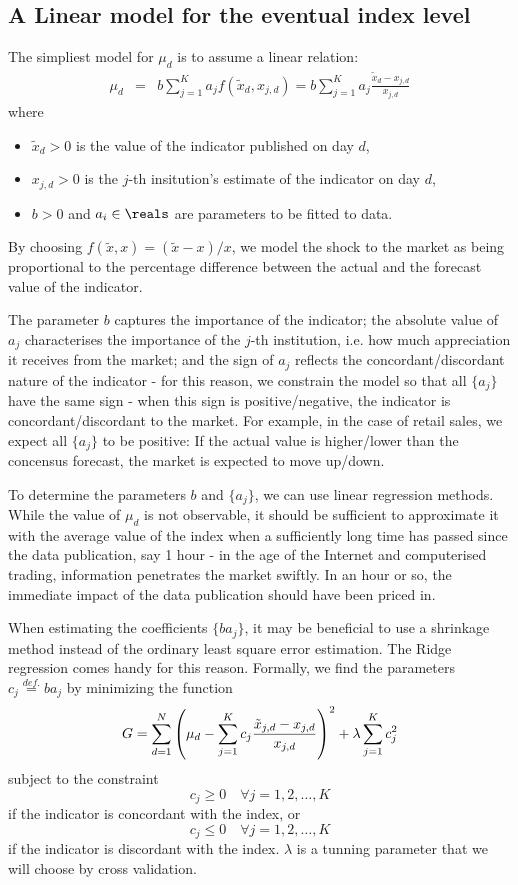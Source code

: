 \documentclass[a4paper,11pt,pdftex,twoside,titlepage]{article}
\begin{document}
\subsection{A Linear model for the eventual index level}
\label{sec:LinearModel}
The simpliest model for $\mu_d$ is to assume a linear relation:
\begin{eqnarray}
  \label{eq:mu}
  \mu_d &=& b \sum_{j=1}^K a_j f(\tilde x_d, x_{j, d})
          = b \sum_{j=1}^K a_j \frac{\tilde x_d - x_{j,d}}{x_{j, d}}
          \label{eq:linmdl}
\end{eqnarray}
where
\begin{itemize}
  \item $\tilde x_d > 0$ is the value of the indicator published on
    day $d$,
  \item $x_{j, d} > 0$ is the $j$-th insitution's estimate of the
    indicator on day $d$,
\item $b > 0$ and $a_i \in \reals$ are parameters to be fitted to data.
\end{itemize}
By choosing $f(\tilde x, x) = (\tilde x - x)/x$, we model the shock to
the market as being proportional to the percentage difference between
the actual and the forecast value of the indicator.

The parameter $b$ captures the
importance of the indicator; the absolute value of $a_j$ characterises
the importance of the $j$-th institution, i.e. how much appreciation
it receives from the market; and the sign of $a_j$ reflects the
concordant/discordant nature of the indicator - for this reason, we
constrain the model so that all $\{a_j\}$ have the same sign - when
this sign is positive/negative, the indicator is concordant/discordant to
the market. For example, in the case of retail sales, we expect all
$\{a_j\}$ to be positive: If the actual value is higher/lower than the
concensus forecast, the market is expected to move up/down.

To determine the parameters $b$ and $\{a_j\}$, we can use linear
regression methods. While the value of $\mu_d$ is not
observable, it should be sufficient to approximate it with the average
value of the index when a sufficiently long time has passed since the
data publication, say 1 hour  - in the age of the Internet and
computerised trading, information penetrates the market swiftly. In an
hour or so, the immediate impact of the data publication should have
been priced in.

When estimating the coefficients $\{b a_j\}$, it may be beneficial to
use a shrinkage method instead of the ordinary least square error
estimation. The Ridge regression comes handy for this
reason. Formally, we find the parameters $c_j \overset{def.}{=} b a_j$
by minimizing the function
\[
  G =
  \sum_{d=1}^N
  \left(\mu_d - \sum_{j=1}^K c_j {\tilde x_{j, d} - x_{j, d} \over x_{j,d}}\right)^2
  + \lambda \sum_{j=1}^K c_j^2
\]
subject to the constraint
\[
  c_j \geq 0 \quad \forall j = 1,2,\dots,K
\]
if the indicator is concordant with the index, or
\[
  c_j \leq 0 \quad \forall j = 1,2,\dots,K
\]
if the indicator is discordant with the index. $\lambda$ is a
tunning parameter that we will choose by cross validation.
\end{document}
